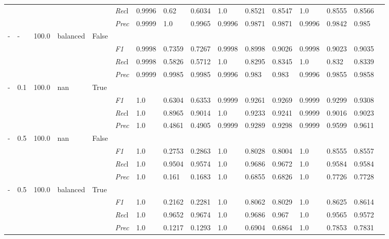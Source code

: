\begin{table}[]
\begin{tabularx}{\textwidth}{XXXXX|X|XXX|XXX|XXXX}
    & & & & & \textit{Rec}l & 0.9996 & 0.62 & 0.6034    & 1.0 & 0.8521    & 0.8547    & 1.0    & 0.8555    & 0.8566    \\
    & & & & & \textit{Prec} & 0.9999 & 1.0 & 0.9965 & 0.9996 & 0.9871 & 0.9871 & 0.9996 & 0.9842 & 0.985 \\ \midrule
    - & - & 100.0 & balanced & False& & & & & & & & & \\
    & & & & & \textit{F1} & 0.9998 & 0.7359 & 0.7267 & 0.9998 & 0.8998        & 0.9026        & 0.9998        & 0.9023        & 0.9035        \\
    & & & & & \textit{Rec}l & 0.9998 & 0.5826 & 0.5712    & 1.0 & 0.8295    & 0.8345    & 1.0    & 0.832    & 0.8339    \\
    & & & & & \textit{Prec} & 0.9999 & 0.9985 & 0.9985 & 0.9996 & 0.983 & 0.983 & 0.9996 & 0.9855 & 0.9858 \\ \midrule
    - & 0.1 & 100.0 & nan & True& & & & & & & & & \\
    & & & & & \textit{F1} & 1.0 & 0.6304 & 0.6353 & 0.9999 & 0.9261        & 0.9269        & 0.9999        & 0.9299        & 0.9308        \\
    & & & & & \textit{Rec}l & 1.0 & 0.8965 & 0.9014    & 1.0 & 0.9233    & 0.9241    & 0.9999    & 0.9016    & 0.9023    \\
    & & & & & \textit{Prec} & 1.0 & 0.4861 & 0.4905 & 0.9999 & 0.9289 & 0.9298 & 0.9999 & 0.9599 & 0.9611 \\ \midrule
    - & 0.5 & 100.0 & nan & False& & & & & & & & & \\
    & & & & & \textit{F1} & 1.0 & 0.2753 & 0.2863 & 1.0 & 0.8028        & 0.8004        & 1.0        & 0.8555        & 0.8557        \\
    & & & & & \textit{Rec}l & 1.0 & 0.9504 & 0.9574    & 1.0 & 0.9686    & 0.9672    & 1.0    & 0.9584    & 0.9584    \\
    & & & & & \textit{Prec} & 1.0 & 0.161 & 0.1683 & 1.0 & 0.6855 & 0.6826 & 1.0 & 0.7726 & 0.7728 \\ \midrule
    - & 0.5 & 100.0 & balanced & True& & & & & & & & & \\
    & & & & & \textit{F1} & 1.0 & 0.2162 & 0.2281 & 1.0 & 0.8062        & 0.8029        & 1.0        & 0.8625        & 0.8614        \\
    & & & & & \textit{Rec}l & 1.0 & 0.9652 & 0.9674    & 1.0 & 0.9686    & 0.967    & 1.0    & 0.9565    & 0.9572    \\
    & & & & & \textit{Prec} & 1.0 & 0.1217 & 0.1293 & 1.0 & 0.6904 & 0.6864 & 1.0 & 0.7853 & 0.7831 \\ \midrule

\end{tabularx}
\end{table}

